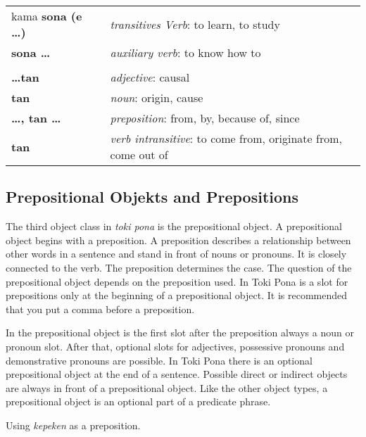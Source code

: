 \begin{supertabular}{p{2,5cm}|ll}
kama \textbf{sona (e \dots)} && \textit{transitives Verb}: to learn, to study \\ %
\textbf{sona \dots} && \textit{auxiliary verb}: to know how to \\ %
 && \\ %
%
\textbf{\dots tan} && \textit{adjective}: causal \\ %
\textbf{tan} && \textit{noun}: origin, cause \\ %
\textbf{\dots , tan \dots} && \textit{preposition}: from, by, because of, since \\ %
\textbf{tan} && \textit{verb intransitive}: to come from, originate from, come out of \\ %
\end{supertabular}
%
\newpage
%
\subsection*{Prepositional Objekts and Prepositions}
%
%
The third object class in \textit{toki pona} is the prepositional object. 
A prepositional object begins with a preposition. 
A preposition describes a relationship between other words in a sentence and stand in front of nouns or pronouns. 
It is closely connected to the verb. 
The preposition determines the case. 
The question of the prepositional object depends on the preposition used. 
In Toki Pona is a slot for prepositions only at the beginning of a prepositional object. 
It is recommended that you put a comma before a preposition.

In the prepositional object is the first slot after the preposition always a noun or pronoun slot.
After that, optional slots for adjectives, possessive pronouns and demonstrative pronouns are possible. 
In Toki Pona there is an optional prepositional object at the end of a sentence. 
Possible direct or indirect objects are always in front of a prepositional object. 
Like the other object types, a prepositional object is an optional part of a predicate phrase. 


Using \textit{kepeken} as a preposition.

